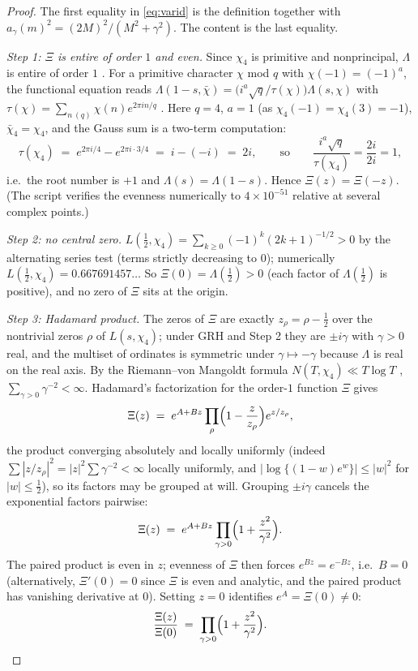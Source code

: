 \documentclass[11pt]{article}
\begin{document}
\begin{proof}
The first equality in \eqref{eq:varid} is the definition together with
$a_\gamma(m)^2=(2M)^2/(M^2+\gamma^2)$. The content is the last
equality.

\emph{Step 1: $\Xi$ is entire of order $1$ and even.} Since $\chi_4$ is
primitive and nonprincipal, $\Lambda$ is entire of order $1$
\cite[Chs.~9, 12]{Dav00}. For a primitive character $\chi$ mod $q$ with
$\chi(-1)=(-1)^a$, the functional equation reads
$\Lambda(1-s,\bar\chi)=\bigl(i^a\sqrt q/\tau(\chi)\bigr)\Lambda(s,\chi)$
with $\tau(\chi)=\sum_{n\ (q)}\chi(n)e^{2\pi in/q}$ \cite[Ch.~9]{Dav00}.
Here $q=4$, $a=1$ (as $\chi_4(-1)=\chi_4(3)=-1$), $\bar\chi_4=\chi_4$,
and the Gauss sum is a two-term computation:
\[
\tau(\chi_4)\;=\;e^{2\pi i/4}-e^{2\pi i\cdot3/4}\;=\;i-(-i)\;=\;2i,
\qquad\text{so}\qquad
\frac{i^a\sqrt q}{\tau(\chi_4)}=\frac{2i}{2i}=1,
\]
i.e.\ the root number is $+1$ and $\Lambda(s)=\Lambda(1-s)$. Hence
$\Xi(z)=\Xi(-z)$. (The script verifies the evenness numerically to
$4\times10^{-51}$ relative at several complex points.)

\emph{Step 2: no central zero.} $L(\tfrac12,\chi_4)
=\sum_{k\ge0}(-1)^k(2k+1)^{-1/2}>0$ by the alternating series test
(terms strictly decreasing to $0$); numerically
$L(\tfrac12,\chi_4)=0.667691457\ldots$ So $\Xi(0)=\Lambda(\tfrac12)>0$
(each factor of $\Lambda(\tfrac12)$ is positive), and no zero of $\Xi$
sits at the origin.

\emph{Step 3: Hadamard product.} The zeros of $\Xi$ are exactly
$z_\rho=\rho-\tfrac12$ over the nontrivial zeros $\rho$ of
$L(s,\chi_4)$; under GRH and Step 2 they are $\pm i\gamma$ with
$\gamma>0$ real, and the multiset of ordinates is symmetric under
$\gamma\mapsto-\gamma$ because $\Lambda$ is real on the real axis. By
the Riemann--von Mangoldt formula $N(T,\chi_4)\ll T\log T$
\cite[\S16]{Dav00}, $\sum_{\gamma>0}\gamma^{-2}<\infty$. Hadamard's
factorization for the order-$1$ function $\Xi$ gives
\[
\Xi(z)\;=\;e^{A+Bz}\prod_{\rho}\Bigl(1-\frac{z}{z_\rho}\Bigr)e^{z/z_\rho},
\]
the product converging absolutely and locally uniformly (indeed
$\sum|z/z_\rho|^2=|z|^2\sum\gamma^{-2}<\infty$ locally uniformly, and
$|\log\{(1-w)e^{w}\}|\le|w|^2$ for $|w|\le\tfrac12$), so its factors
may be grouped at will. Grouping $\pm i\gamma$ cancels the exponential
factors pairwise:
\[
\Xi(z)\;=\;e^{A+Bz}\prod_{\gamma>0}\Bigl(1+\frac{z^2}{\gamma^2}\Bigr).
\]
The paired product is even in $z$; evenness of $\Xi$ then forces
$e^{Bz}=e^{-Bz}$, i.e.\ $B=0$ (alternatively, $\Xi'(0)=0$ since $\Xi$
is even and analytic, and the paired product has vanishing derivative
at $0$). Setting $z=0$ identifies $e^A=\Xi(0)\ne0$:
\begin{equation}\label{eq:hadamard}
\frac{\Xi(z)}{\Xi(0)}\;=\;\prod_{\gamma>0}
\Bigl(1+\frac{z^2}{\gamma^2}\Bigr).
\end{equation}


\end{proof}
\end{document}
